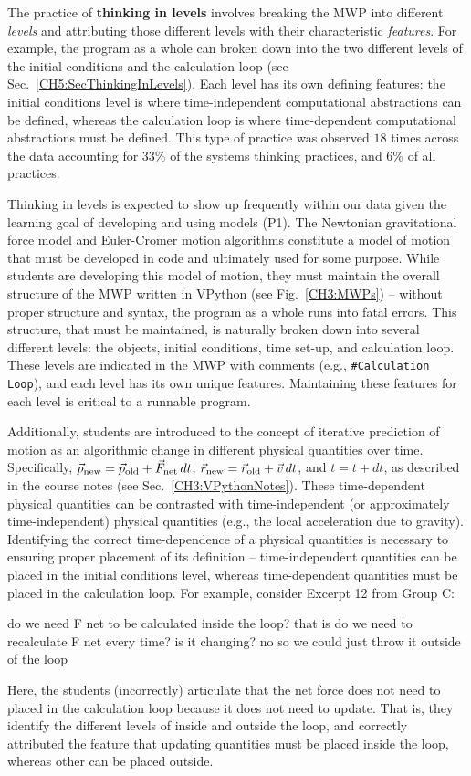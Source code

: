 \documentclass{msuphddissertation}
\begin{document}
\begin{doublespace}
The practice of \textbf{thinking in levels} involves breaking the MWP into different \textit{levels} and attributing those different levels with their characteristic \textit{features}.  For example, the program as a whole can broken down into the two different levels of the initial conditions and the calculation loop (see Sec.~\ref{CH5:SecThinkingInLevels}).  Each level has its own defining features: the initial conditions level is where time-independent computational abstractions can be defined, whereas the calculation loop is where time-dependent computational abstractions must be defined.  This type of practice was observed $18$ times across the data  accounting for $33\%$ of the systems thinking practices, and $6\%$ of all practices.

Thinking in levels is expected to show up frequently within our data given the learning goal of developing and using models (P1).  The Newtonian gravitational force model and Euler-Cromer motion algorithms constitute a model of motion that must be developed in code and ultimately used for some purpose.  While students are developing this model of motion, they must maintain the overall structure of the MWP written in VPython (see Fig.~\ref{CH3:MWPs}) -- without proper structure and syntax, the program as a whole runs into fatal errors.  This structure, that must be maintained, is naturally broken down into several different levels: the objects, initial conditions, time set-up, and calculation loop.  These levels are indicated in the MWP with comments (e.g., \texttt{\#Calculation Loop}), and each level has its own unique features.  Maintaining these features for each level is critical to a runnable program.

Additionally, students are introduced to the concept of iterative prediction of motion as an algorithmic change in different physical quantities over time.  Specifically, $\vec{p}_{\rm new} = \vec{p}_{\rm old} + \vec{F}_{\rm net}\,dt$, $\vec{r}_{\rm new} = \vec{r}_{\rm old} + \vec{v}\,dt$, and $t = t + dt$, as described in the course notes (see Sec.~\ref{CH3:VPythonNotes}).  These time-dependent physical quantities can be contrasted with time-independent (or approximately time-independent) physical quantities (e.g., the local acceleration due to gravity).  Identifying the correct time-dependence of a physical quantities is necessary to ensuring proper placement of its definition -- time-independent quantities can be placed in the initial conditions level, whereas time-dependent quantities must be placed in the calculation loop.  For example, consider Excerpt 12 from Group C:  \begin{description}
\SA do we need F net to be calculated inside the loop?
\SA that is do we need to recalculate F net every time? is it changing?
\SB no	
\SA so we could just throw it outside of the loop\end{description}  Here, the students (incorrectly) articulate that the net force does not need to placed in the calculation loop because it does not need to update.  That is, they identify the different levels of inside and outside the loop, and correctly attributed the feature that updating quantities must be placed inside the loop, whereas other can be placed outside.


\end{doublespace}
\end{document}
